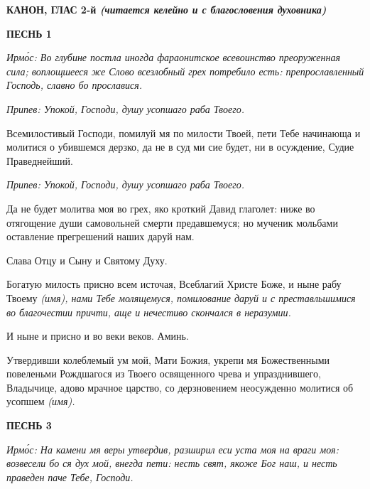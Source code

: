 \bfseries КАНОН, ГЛАС 2-й\normalfont{}
\itshape (читается келейно и с благословения
духовника)\normalfont{}


 

\bfseries ПЕСНЬ 1\normalfont{}


 \itshape Ирмо́с:\normalfont{} Во глубине постла иногда фараонитское всевоинство преоруженная
сила; воплощшееся же Слово всезлобный грех потребило есть: препрославленный
Господь, славно бо прославися.



 \itshape Припев:\normalfont{} Упокой, Господи, душу усопшаго раба Твоего.



   Всемилостивый Господи, помилуй мя по милости Твоей, пети Тебе
начинающа и молитися о убившемся дерзко, да не в суд ми сие будет, ни в
осуждение, Судие Праведнейший.



 \itshape Припев:\normalfont{} Упокой, Господи, душу усопшаго раба Твоего.



   Да не будет молитва моя во грех, яко кроткий Давид глаголет: ниже во
отягощение души самовольней смерти предавшемуся; но мученик мольбами
оставление прегрешений наших даруй нам.



   Слава Отцу и Сыну и Святому Духу.



   Богатую милость присно всем источая, Всеблагий Христе Боже, и ныне
рабу Твоему \itshape  (имя)\normalfont{}, нами Тебе молящемуся, помилование даруй и с
преставльшимися во благочестии причти, аще и нечестиво скончался в
неразумии.



   И ныне и присно и во веки веков. Аминь.



   Утвердивши колеблемый ум мой, Мати Божия, укрепи мя Божественными
повеленьми Рождшагося из Твоего освященного чрева и упразднившего,
Владычице, адово мрачное царство, со дерзновением неосужденно молитися
об усопшем \itshape  (имя)\normalfont{}.



 

\bfseries ПЕСНЬ 3\normalfont{}


 \itshape Ирмо́с:\normalfont{} На камени мя веры утвердив, разширил еси уста моя на враги моя:
возвесели бо ся дух мой, внегда пети: несть свят, якоже Бог наш, и несть праведен
паче Тебе, Господи.



